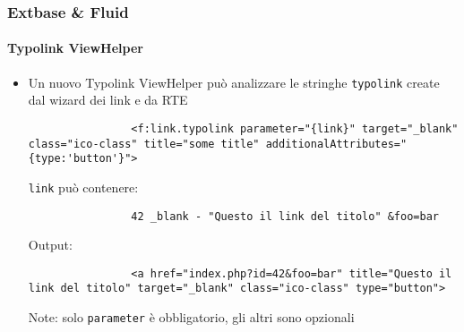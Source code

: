 
\begin{frame}[fragile]
	\frametitle{Extbase \& Fluid}
	\framesubtitle{Typolink ViewHelper}

	\lstset{
		basicstyle=\tiny\ttfamily
	}

	\begin{itemize}
		\item Un nuovo Typolink ViewHelper può analizzare le stringhe \texttt{typolink} create dal wizard dei link e da RTE

			\begin{lstlisting}
				<f:link.typolink parameter="{link}" target="_blank" class="ico-class" title="some title" additionalAttributes="{type:'button'}">
			\end{lstlisting}

			\texttt{link} può contenere:
			\begin{lstlisting}
				42 _blank - "Questo il link del titolo" &foo=bar
			\end{lstlisting}

			Output:
			\begin{lstlisting}
				<a href="index.php?id=42&foo=bar" title="Questo il link del titolo" target="_blank" class="ico-class" type="button">
			\end{lstlisting}

			Note: solo \texttt{parameter} è obbligatorio, gli altri sono opzionali

	\end{itemize}

\end{frame}



